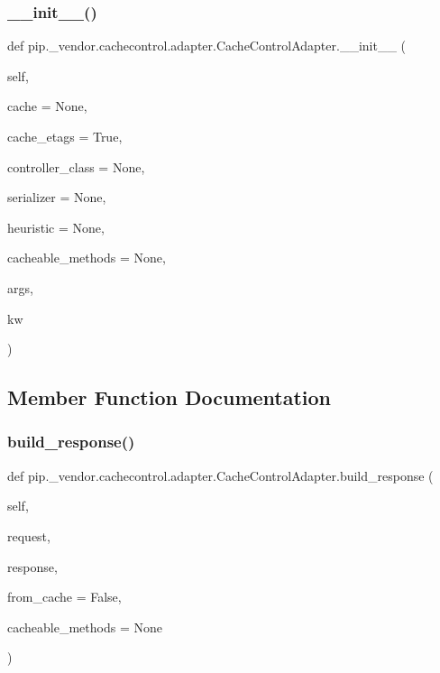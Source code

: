 \subsubsection{\texorpdfstring{\+\_\+\+\_\+init\+\_\+\+\_\+()}{\_\_init\_\_()}}
{\footnotesize\ttfamily def pip.\+\_\+vendor.\+cachecontrol.\+adapter.\+Cache\+Control\+Adapter.\+\_\+\+\_\+init\+\_\+\+\_\+ (\begin{DoxyParamCaption}\item[{}]{self,  }\item[{}]{cache = {\ttfamily None},  }\item[{}]{cache\+\_\+etags = {\ttfamily True},  }\item[{}]{controller\+\_\+class = {\ttfamily None},  }\item[{}]{serializer = {\ttfamily None},  }\item[{}]{heuristic = {\ttfamily None},  }\item[{}]{cacheable\+\_\+methods = {\ttfamily None},  }\item[{}]{args,  }\item[{}]{kw }\end{DoxyParamCaption})}



\subsection{Member Function Documentation}
\mbox{\label{classpip_1_1__vendor_1_1cachecontrol_1_1adapter_1_1CacheControlAdapter_a3989016f8c12cf716f18d8436eeb5416}} 
\subsubsection{\texorpdfstring{build\+\_\+response()}{build\_response()}}
{\footnotesize\ttfamily def pip.\+\_\+vendor.\+cachecontrol.\+adapter.\+Cache\+Control\+Adapter.\+build\+\_\+response (\begin{DoxyParamCaption}\item[{}]{self,  }\item[{}]{request,  }\item[{}]{response,  }\item[{}]{from\+\_\+cache = {\ttfamily False},  }\item[{}]{cacheable\+\_\+methods = {\ttfamily None} }\end{DoxyParamCaption})}

